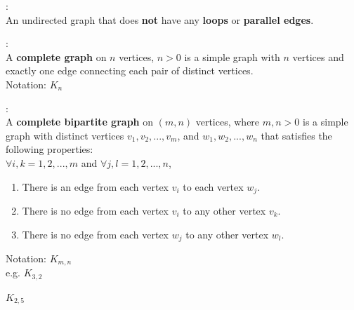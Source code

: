 \documentclass[10pt,landscape,a4paper]{article}
\newenvironment{descitemize} %
{\begin{description}[leftmargin=*,before=\let\makelabel\descitemlabel]}
{\end{description}}
\newcommand{\descitemlabel}[1]{%
\textbullet\ \textbf{#1}%
}
\begin{document}
\begin{multicols*}{4}
\begin{descitemize}
    \item [Simple Graph]:\\
    An undirected graph that does \textbf{not} have any \textbf{loops} or \textbf{parallel edges}.

    \item [Complete Graph]:\\
    A \textbf{complete graph} on $n$ vertices, $n>0$ is a simple graph with $n$ vertices and exactly one edge connecting each pair of distinct vertices.\\
    Notation: $K_n$

    \item [Complete Bipartite Graph]:\\
    A \textbf{complete bipartite graph} on $(m,n)$ vertices, where $m,n>0$ is a simple graph with distinct vertices $v_1,v_2,...,v_m$, and $w_1,w_2,...,w_n$ that satisfies the following properties:\\
    $\forall i,k=1,2,...,m$ and $\forall j,l=1,2,...,n$,
    \begin{enumerate}
      \item There is an edge from each vertex $v_i$ to each vertex $w_j$.
      \item There is no edge from each vertex $v_i$ to any other vertex $v_k$.
      \item There is no edge from each vertex $w_j$ to any other vertex $w_l$.
    \end{enumerate}
    Notation: $K_{m,n}$\\
    e.g. $K_{3,2}$
    \hspace{1cm}
    $K_{2,5}$
\end{descitemize}
\end{multicols*}
\end{document}
